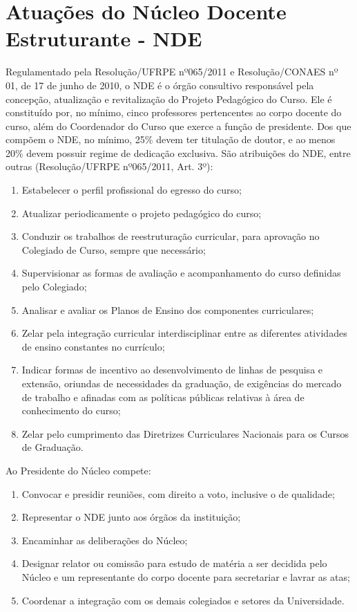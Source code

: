 \section{Atuações do Núcleo Docente Estruturante - NDE}

Regulamentado pela Resolução/UFRPE nº065/2011 e Resolução/CONAES nº 01, de 17 de junho de 2010, o NDE é o órgão consultivo responsável pela concepção, atualização e revitalização do Projeto Pedagógico do Curso. Ele é constituído por, no mínimo, cinco professores pertencentes ao corpo docente do curso, além do Coordenador do Curso que exerce a função de presidente. Dos que compõem o NDE, no mínimo, 25\% devem ter titulação de doutor, e ao menos 20\% devem possuir regime de dedicação exclusiva. São atribuições do NDE, entre outras (Resolução/UFRPE nº065/2011, Art. 3º):

\begin{enumerate}
    \item Estabelecer o perfil profissional do egresso do curso; 	
    \item Atualizar periodicamente o projeto pedagógico do curso; 	
    \item Conduzir os trabalhos de reestruturação curricular, para aprovação no Colegiado de Curso, sempre que necessário;
    \item Supervisionar as formas de avaliação e acompanhamento do curso definidas pelo Colegiado; 	
    \item Analisar e avaliar os Planos de Ensino dos componentes curriculares;
    \item Zelar pela integração curricular interdisciplinar entre as diferentes atividades de ensino constantes no currículo; 	
    \item Indicar formas de incentivo ao desenvolvimento de linhas de pesquisa e extensão, oriundas de necessidades da graduação, de exigências do mercado de trabalho e afinadas com as políticas públicas relativas à área de conhecimento do curso; 	
    \item Zelar pelo cumprimento das Diretrizes Curriculares Nacionais para os Cursos de Graduação.
\end{enumerate}

Ao Presidente do Núcleo compete:

\begin{enumerate}
    \item Convocar e presidir reuniões, com direito a voto, inclusive o de qualidade;
    \item Representar o NDE junto aos 	órgãos da instituição; 	
    \item Encaminhar as deliberações do Núcleo; 	
    \item Designar relator ou comissão 	para estudo de matéria a ser decidida pelo Núcleo e um representante do corpo docente para secretariar e lavrar as atas;
    \item Coordenar a integração com os demais colegiados e setores da Universidade.
\end{enumerate}
